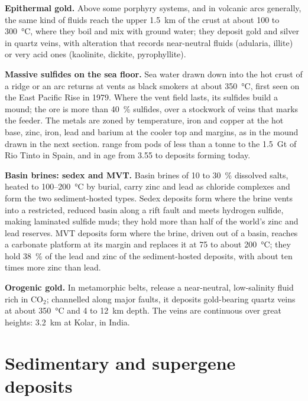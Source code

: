 \textbf{Epithermal gold.} Above some porphyry systems, and in volcanic arcs generally, the same
kind of fluids reach the upper \qty{1.5}{km} of the crust at about 100 to \qty{300}{\celsius},
where they boil and mix with ground water; they deposit gold and silver in quartz veins, with
alteration that records near-neutral fluids (adularia, illite) or very acid ones (kaolinite,
dickite, pyrophyllite).

\textbf{Massive sulfides on the sea floor.} Sea water drawn down into the hot crust of a ridge or
an arc returns at vents as black smokers at about \qty{350}{\celsius}, first seen on the East
Pacific Rise in 1979. Where the vent field lasts, its sulfides build a mound; the ore is more than
\qty{40}{\percent} sulfides, over a stockwork of veins that marks the feeder. The metals are zoned
by temperature, iron and copper at the hot base, zinc, iron, lead and barium at the cooler top and
margins, as in the mound drawn in the next section.  range from pods of less than a tonne to the \qty{1.5}{Gt} of Rio Tinto in Spain, and in
age from \qty{3.55}{\Ga} to deposits forming today.

\textbf{Basin brines: sedex and MVT.} Basin brines of 10 to \qty{30}{\percent} dissolved salts,
heated to 100--\qty{200}{\celsius} by burial, carry zinc and lead as chloride complexes and form the
two sediment-hosted types. Sedex deposits form where the brine vents into a restricted, reduced
basin along a rift fault and meets hydrogen sulfide, making laminated sulfide muds; they hold more
than half of the world's zinc and lead reserves. MVT deposits form where the brine, driven out of a
basin, reaches a carbonate platform at its margin and replaces it at 75 to about
\qty{200}{\celsius}; they hold \qty{38}{\percent} of the lead and zinc of the sediment-hosted
deposits, with about ten times more zinc than lead.

\textbf{Orogenic gold.} In metamorphic belts,  release a near-neutral,
low-salinity fluid rich in CO$_2$; channelled along major faults, it deposits gold-bearing quartz
veins at about \qty{350}{\celsius} and 4 to \qty{12}{km} depth. The veins are continuous over
great heights: \qty{3.2}{km} at Kolar, in India.

\section{Sedimentary and supergene deposits}\label{sec:b2:ore-deposits:sedimentary}

